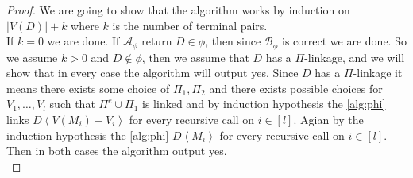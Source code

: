 \begin{proof}
    We are going to show that the algorithm works by induction on $|V(D)|+k$ where $k$ is the number of terminal pairs.\\
    If $k=0$ we are done.
    If $\mathcal{A}_\phi$ return $D\in \phi$, then since $\mathcal{B}_\phi$ is correct we are done.
    So we assume $k>0$ and $D\notin \phi$, then we assume that $D$ has a $\Pi$-linkage, and we will show that in every case the algorithm will output yes.
    Since $D$ has a $\Pi$-linkage it means there exists some choice of $\Pi_1,\Pi_2$ and there exists possible choices for $V_1,\dots ,V_l$ such that $\Pi^e\cup \Pi_1$ is linked and by induction hypothesis the \autoref{alg:phi} links $D\left<V(M_i)-V_i \right>$ for every recursive call on $i\in [l]$. Agian by the induction hypothesis the \autoref{alg:phi} $D\left< M_i\right>$ for every recursive call on $i\in [l]$. Then in both cases the algorithm output yes.\\


\end{proof}
